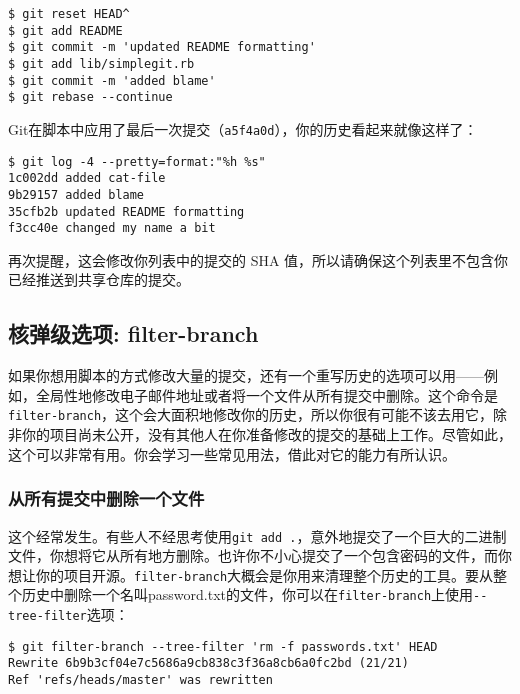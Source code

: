 \documentclass[a4paper]{book}
\begin{document}
\begin{shaded}\begin{verbatim}
$ git reset HEAD^
$ git add README
$ git commit -m 'updated README formatting'
$ git add lib/simplegit.rb
$ git commit -m 'added blame'
$ git rebase --continue
\end{verbatim}\end{shaded}

Git在脚本中应用了最后一次提交（\texttt{a5f4a0d}），你的历史看起来就像这样了：

\begin{shaded}\begin{verbatim}
$ git log -4 --pretty=format:"%h %s"
1c002dd added cat-file
9b29157 added blame
35cfb2b updated README formatting
f3cc40e changed my name a bit
\end{verbatim}\end{shaded}

再次提醒，这会修改你列表中的提交的 SHA 值，所以请确保这个列表里不包含你已经推送到共享仓库的提交。

\subsection{核弹级选项: filter-branch}

如果你想用脚本的方式修改大量的提交，还有一个重写历史的选项可以用------例如，全局性地修改电子邮件地址或者将一个文件从所有提交中删除。这个命令是\texttt{filter-branch}，这个会大面积地修改你的历史，所以你很有可能不该去用它，除非你的项目尚未公开，没有其他人在你准备修改的提交的基础上工作。尽管如此，这个可以非常有用。你会学习一些常见用法，借此对它的能力有所认识。

\subsubsection{从所有提交中删除一个文件}

这个经常发生。有些人不经思考使用\texttt{git add .}，意外地提交了一个巨大的二进制文件，你想将它从所有地方删除。也许你不小心提交了一个包含密码的文件，而你想让你的项目开源。\texttt{filter-branch}大概会是你用来清理整个历史的工具。要从整个历史中删除一个名叫password.txt的文件，你可以在\texttt{filter-branch}上使用\texttt{-{}-tree-filter}选项：

\begin{shaded}\begin{verbatim}
$ git filter-branch --tree-filter 'rm -f passwords.txt' HEAD
Rewrite 6b9b3cf04e7c5686a9cb838c3f36a8cb6a0fc2bd (21/21)
Ref 'refs/heads/master' was rewritten
\end{verbatim}\end{shaded}
\end{document}
